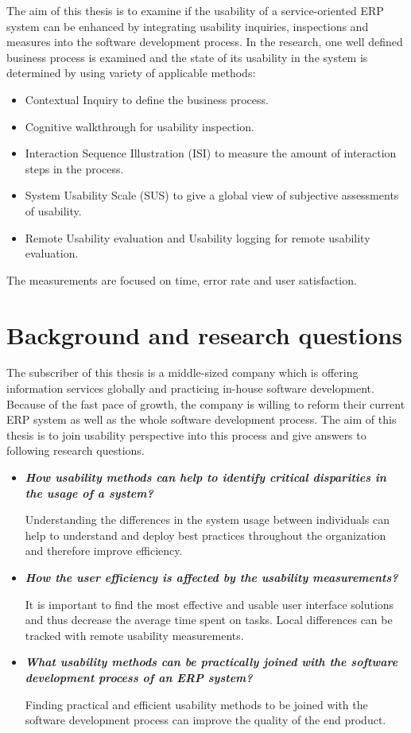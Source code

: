 \documentclass[12pt,a4paper,oneside,pdftex]{report}
\begin{document}
The aim of this thesis is to examine if the usability of a service-oriented ERP system can be enhanced by integrating usability inquiries, inspections and measures into the software development process. In the research, one well defined business process is examined and the state of its usability in the system is determined  by using variety of applicable methods:
\begin{itemize}
\item Contextual Inquiry to define the business process.
\item Cognitive walkthrough for usability inspection.
\item Interaction Sequence Illustration (ISI) to measure the amount of interaction steps in the process.
\item System Usability Scale (SUS) to give a global view of subjective assessments of usability.
\item Remote Usability evaluation and Usability logging for remote usability evaluation.
\end{itemize}
The measurements are focused on time, error rate and user satisfaction.

\section{Background and research questions}
\label{sec:backgroundandresearchquestions}
The subscriber of this thesis is a middle-sized company which is offering information services globally and practicing in-house software development. Because of the fast pace of growth, the company is willing to reform their current ERP system as well as the whole software development process. The aim of this thesis is to join usability perspective into this process and give answers to following research questions.

\begin{itemize}
\item \textbf{\emph{How usability methods can help to identify critical disparities in the usage of a system?}}

Understanding the differences in the system usage between individuals can help to understand and deploy best practices throughout the organization and therefore improve efficiency.

\item \textbf{\emph{How the user efficiency is affected by the usability measurements?}}

It is important to find the most effective and usable user interface solutions and thus decrease the average time spent on tasks. Local differences can be tracked with remote usability measurements.

\item \textbf{\emph{What usability methods can be practically joined with the software development process of an ERP system?}}

Finding practical and efficient usability methods to be joined with the software development process can improve the quality of the end product.

\end{itemize}
\end{document}
